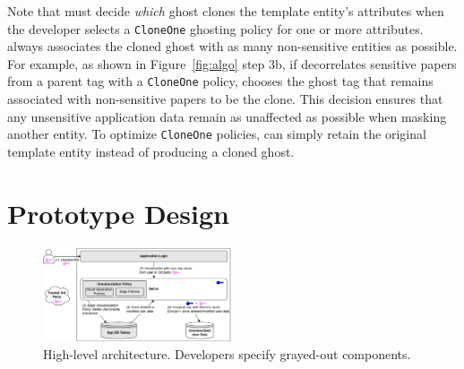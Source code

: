Note that \sys must decide \emph{which} ghost clones the template entity's attributes when the
developer selects a \texttt{CloneOne} ghosting policy for one or more attributes. \sys always
associates the cloned ghost with as many non-sensitive entities as possible. For example, as shown
in Figure~\ref{fig:algo} step 3b, if \sys decorrelates sensitive papers from a parent tag with a
\texttt{CloneOne} policy, \sys chooses the ghost tag that remains associated with non-sensitive
papers to be the clone. This decision ensures that any unsensitive application
data remain as unaffected as possible when masking another entity.
To optimize
\texttt{CloneOne} policies, \sys can simply retain the original template entity instead of producing
a cloned ghost.
\fi



\section{Prototype Design}
\label{sec:proto}

\begin{figure}[t!]
    \centering
    \includegraphics[width=0.5\textwidth]{img/releaser_arch}

    \caption{High-level \sys architecture. Developers specify grayed-out components.}
    \label{fig:arch}
\end{figure}


